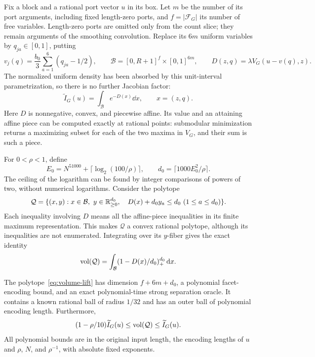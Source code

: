 Fix a block and a rational port vector $u$ in its box. Let $m$ be the
number of its port arguments, including fixed length-zero ports, and
$f=|\mathcal F_G|$ its number of free variables. Length-zero ports are
omitted only from the count slice; they remain arguments of the smoothing
convolution.
Replace its $6m$ uniform variables by $q_{ja}\in[0,1]$, putting
\[
 v_j(q)=\frac{b_0}{3}\sum_{a=1}^6(q_{ja}-1/2),\qquad
 \mathcal B=[0,R+1]^f\times[0,1]^{6m},\qquad
 D(z,q)=\lambda V_G(u-v(q),z).
\]
The normalized uniform density has been absorbed by this unit-interval
parametrization, so there is no further Jacobian factor:
\begin{equation}\label{eq:exponential-box-integral}
 \widetilde I_G(u)=\int_{\mathcal B}e^{-D(x)}\dd x,
 \qquad x=(z,q).
\end{equation}
Here $D$ is nonnegative, convex, and piecewise affine. Its value and an
attaining affine piece can be computed exactly at rational points:
submodular minimization returns a maximizing subset for each of the
two maxima in $V_G$, and their sum is such a piece.

For $0<\rho<1$, define
\begin{equation}\label{eq:volume-lift-scales}
 E_0=N^{51000}+\lceil\log_2(100/\rho)\rceil,
 \qquad d_0=\lceil1000E_0^2/\rho\rceil.
\end{equation}
The ceiling of the logarithm can be found by integer comparisons of
powers of two, without numerical logarithms. Consider the polytope
\begin{equation}\label{eq:volume-lift}
 \mathcal Q=\{(x,y):x\in\mathcal B,\ y\in\mathbb R_{\ge0}^{d_0},\quad
                   D(x)+d_0y_a\le d_0\ (1\le a\le d_0)\}.
\end{equation}
Each inequality involving $D$ means all the affine-piece inequalities
in its finite maximum representation. This makes $\mathcal Q$ a
convex rational polytope, although its inequalities are not enumerated.
Integrating over its $y$-fiber gives the exact identity
\begin{equation}\label{eq:fiber-volume}
 \operatorname{vol}(\mathcal Q)=\int_{\mathcal B}(1-D(x)/d_0)_+^{d_0}\,\mathrm d x.
\end{equation}

\begin{lemma}
\label{lem:volume-lift}
The polytope~\eqref{eq:volume-lift} has dimension $f+6m+d_0$, a
polynomial facet-encoding bound, and an exact polynomial-time strong
separation oracle. It contains a known rational ball of radius $1/32$
and has an outer ball of polynomial encoding length. Furthermore,
\begin{equation}\label{eq:volume-lift-accuracy}
 (1-\rho/10)\widetilde I_G(u)
       \le\operatorname{vol}(\mathcal Q)\le\widetilde I_G(u).
\end{equation}
All polynomial bounds are in the original input length, the encoding
lengths of $u$ and $\rho$, $N$, and $\rho^{-1}$, with absolute fixed exponents.
\end{lemma}

